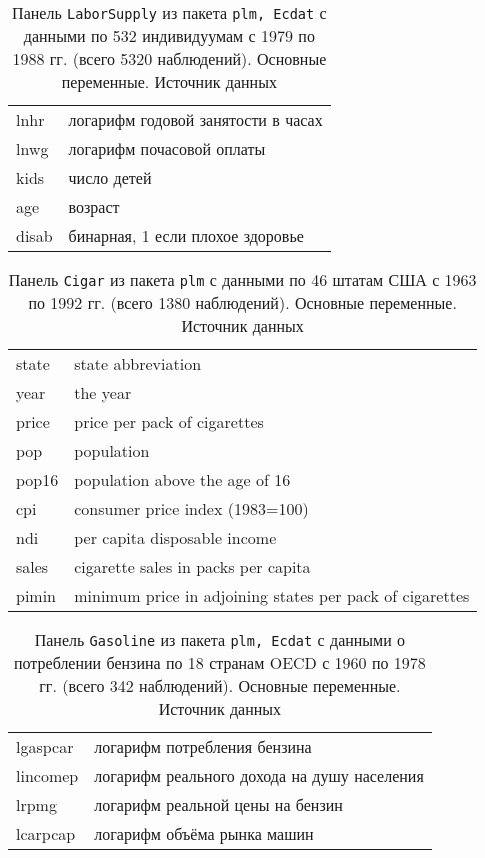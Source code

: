 \documentclass[12pt]{article}
\theoremstyle{remark}
\begin{document}
\begin{table}
	\caption{Панель \texttt{LaborSupply}
	из пакета \texttt{plm, Ecdat} с данными по 532 индивидуумам  с 1979 по 1988 гг.
	(всего 5320 наблюдений).  Основные переменные.
	Источник данных \cite{LaborSupply}}
	\label{LaborSupply}
	\begin{tabular}{l|l}\hline
	lnhr & логарифм годовой занятости в часах \\
	lnwg & логарифм почасовой оплаты \\
	kids &число детей \\
	age & возраст \\
	disab & бинарная, 1 если плохое здоровье \\
	\hline
	\end{tabular}
\end{table}


\begin{table}
	\caption{Панель \texttt{Cigar}
	из пакета \texttt{plm} с данными по 46 штатам США с 1963 по 1992 гг.
	(всего 1380 наблюдений).  Основные переменные.
	Источник данных \cite{Cigar}}
	\label{Cigar}
	\begin{tabular}{l|l}\hline
	state & state abbreviation \\
	year & the year \\
	price & price per pack of cigarettes \\
	pop & population \\
	pop16 & population above the age of 16 \\
	cpi & consumer price index (1983=100) \\
	ndi & per capita disposable income \\
	sales & cigarette sales in packs per capita \\
	pimin & minimum price in adjoining states per pack of cigarettes \\
	\hline
	\end{tabular}
\end{table}

\begin{table}
	\caption{Панель \texttt{Gasoline}
	из пакета \texttt{plm, Ecdat} с данными о потреблении бензина по
	18 странам OECD с 1960 по 1978 гг.
	(всего 342 наблюдений).  Основные переменные.
	Источник данных \cite{Gasoline}}
	\label{Gasoline}
	\begin{tabular}{l|l}\hline
	lgaspcar & логарифм потребления бензина \\
	lincomep & логарифм реального дохода на душу населения \\
	lrpmg & логарифм реальной цены на бензин \\
	lcarpcap & логарифм объёма рынка машин\\
	\hline
	\end{tabular}
\end{table}
\end{document}
